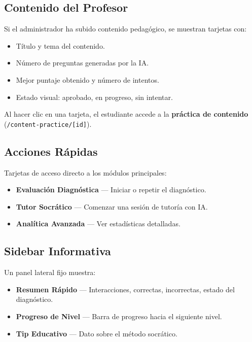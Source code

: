 \documentclass[12pt, a4paper, oneside]{book}
\begin{document}
\subsection{Contenido del Profesor}

Si el administrador ha subido contenido pedagógico, se muestran tarjetas con:
\begin{itemize}
    \item Título y tema del contenido.
    \item Número de preguntas generadas por la IA.
    \item Mejor puntaje obtenido y número de intentos.
    \item Estado visual: \textcolor{yt-green}{} aprobado, \textcolor{yt-amber}{} en progreso, \textcolor{yt-orange}{} sin intentar.
\end{itemize}

Al hacer clic en una tarjeta, el estudiante accede a la \textbf{práctica de contenido} (\texttt{/content-practice/[id]}).

\subsection{Acciones Rápidas}

Tarjetas de acceso directo a los módulos principales:
\begin{itemize}
    \item \textbf{Evaluación Diagnóstica} — Iniciar o repetir el diagnóstico.
    \item \textbf{Tutor Socrático} — Comenzar una sesión de tutoría con IA.
    \item \textbf{Analítica Avanzada} — Ver estadísticas detalladas.
\end{itemize}

\subsection{Sidebar Informativa}

Un panel lateral fijo muestra:
\begin{itemize}
    \item \textbf{Resumen Rápido} — Interacciones, correctas, incorrectas, estado del diagnóstico.
    \item \textbf{Progreso de Nivel} — Barra de progreso hacia el siguiente nivel.
    \item \textbf{Tip Educativo} — Dato sobre el método socrático.
\end{itemize}
\end{document}

